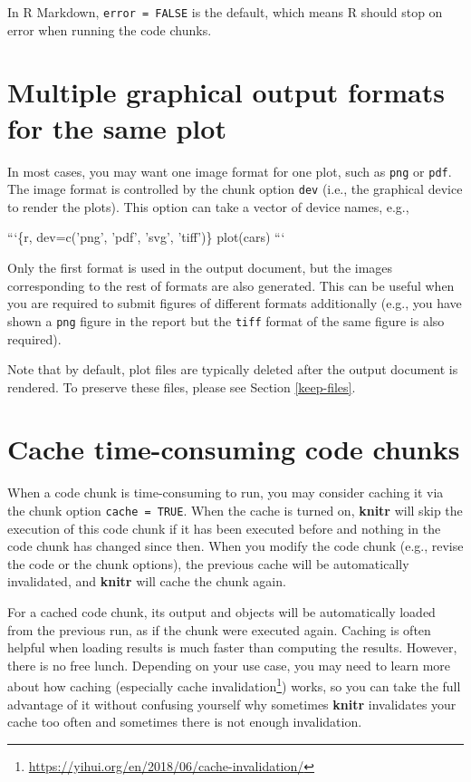 \documentclass[
  11pt,
]{krantz}
\newenvironment{Shaded}{\begin{snugshade}}{\end{snugshade}}
\newcommand{\BaseNTok}[1]{\textcolor[rgb]{0.06,0.06,0.06}{#1}}
\renewcommand{\href}[2]{#2\footnote{\url{#1}}}
\begin{document}
In R Markdown, \texttt{error\ =\ FALSE} is the default, which means R should stop on error when running the code chunks.

\hypertarget{dev-vector}{%
\section{Multiple graphical output formats for the same plot}\label{dev-vector}}

In most cases, you may want one image format for one plot, such as \texttt{png} or \texttt{pdf}. The image format is controlled by the chunk option \texttt{dev} (i.e., the graphical device to render the plots). This option can take a vector of device names, e.g.,

\begin{Shaded}
\begin{Highlighting}[]
\BaseNTok{```\{r, dev=c('png', 'pdf', 'svg', 'tiff')\}}
\BaseNTok{plot(cars)}
\BaseNTok{```}
\end{Highlighting}
\end{Shaded}

Only the first format is used in the output document, but the images corresponding to the rest of formats are also generated. This can be useful when you are required to submit figures of different formats additionally (e.g., you have shown a \texttt{png} figure in the report but the \texttt{tiff} format of the same figure is also required).

Note that by default, plot files are typically deleted after the output document is rendered. To preserve these files, please see Section \ref{keep-files}.

\hypertarget{cache}{%
\section{Cache time-consuming code chunks}\label{cache}}

When a code chunk is time-consuming to run, you may consider caching it via the chunk option \texttt{cache\ =\ TRUE}. When the cache is turned on, \textbf{knitr} will skip the execution of this code chunk if it has been executed before and nothing in the code chunk has changed since then. When you modify the code chunk (e.g., revise the code or the chunk options), the previous cache will be automatically invalidated, and \textbf{knitr} will cache the chunk again.

For a cached code chunk, its output and objects will be automatically loaded from the previous run, as if the chunk were executed again. Caching is often helpful when loading results is much faster than computing the results. However, there is no free lunch. Depending on your use case, you may need to learn more about how caching (especially \href{https://yihui.org/en/2018/06/cache-invalidation/}{cache invalidation}) works, so you can take the full advantage of it without confusing yourself why sometimes \textbf{knitr} invalidates your cache too often and sometimes there is not enough invalidation.
\end{document}
